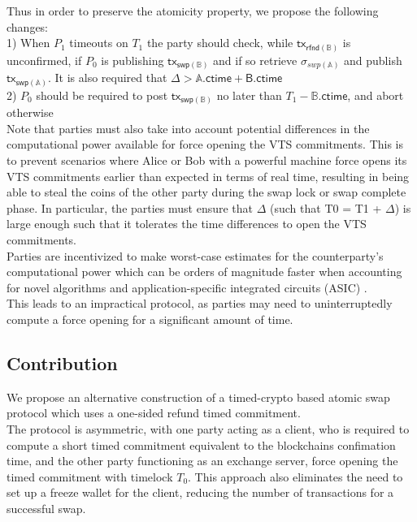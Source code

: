 \documentclass{article}      	%
\begin{document}
Thus in order to preserve the atomicity property, we propose the following changes: \\
1) When $P_1$ timeouts on $T_1$ the party should check, while $\mathsf{tx_{rfnd(\mathbb{B})}}$ is unconfirmed, if $P_0$ is publishing $\mathsf{tx_{swp(\mathbb{B})}}$ and if so retrieve $\sigma_{swp(\mathbb{A})}$ and publish $\mathsf{tx_{swp(\mathbb{A})}}$. It is also required that $\Delta > \mathbb{A}.\mathsf{ctime} + \mathsf{B}.\mathsf{ctime}$ \\
2) $P_0$ should be required to post $\mathsf{tx_{swp(\mathbb{B})}}$ no later than $T_1 - \mathbb{B}.\mathsf{ctime}$, and abort otherwise \\

Note that parties must also take into account potential differences in the computational power available for force opening the VTS commitments. This is to prevent scenarios where Alice or Bob with a powerful machine force opens its VTS commitments earlier than expected in terms of real time, resulting in being able 
to steal the coins of the other party during the swap lock or swap complete phase. In particular, the parties must ensure that $\Delta$ (such that T0 = T1 + $\Delta$) is large enough such that it tolerates the time differences to open the VTS commitments. \\

Parties are incentivized to make worst-case estimates for the counterparty's computational power which can be orders of magnitude faster when accounting for novel algorithms \cite{squaring_algo} and application-specific integrated circuits (ASIC) \cite{squaring_asic}. \\
This leads to an impractical protocol, as parties may need to uninterruptedly compute a force opening for a significant amount of time.







\subsection{Contribution}

We propose an alternative construction of a timed-crypto based atomic swap protocol which uses a one-sided refund timed commitment.  \\
The protocol is asymmetric, with one party acting as a client, who is required to compute a short timed commitment equivalent to the blockchains confimation time, and the other party functioning as an exchange server, force opening the timed commitment with timelock $T_0$.
This approach also eliminates the need to set up a freeze wallet for the client, reducing the number of transactions for a successful swap.
\end{document}
